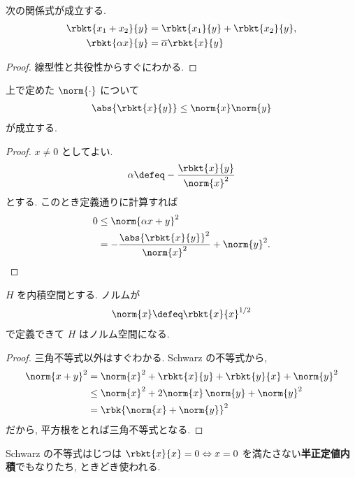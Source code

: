 \documentclass[openany, a4paper, oneside]{jsbook}
\begin{document}
\begin{prop}
 次の関係式が成立する.
 \begin{align}
  \rbkt{x_1 + x_2}{y}
  &=
  \rbkt{x_1}{y} + \rbkt{x_2}{y}, \\
  \rbkt{\alpha x}{y}
  &=
  \overline{\alpha} \rbkt{x}{y}
 \end{align}
\end{prop}
\begin{proof}
線型性と共役性からすぐにわかる.
\end{proof}
\begin{lem}
 上で定めた $\norm{\cdot}$ について
 \begin{align}
  \abs{\rbkt{x}{y}}
  \leq
  \norm{x} \norm{y}
 \end{align}
 が成立する.
\end{lem}
\begin{proof}
$x \neq 0$ としてよい.
\begin{align}
 \alpha
 \defeq
 -\frac{\rbkt{x}{y}}{\norm{x}^2}
\end{align}
とする.
このとき定義通りに計算すれば
\begin{align}
 0
 &\le
 \norm{\alpha x + y}^2 \\
 &=
 -\frac{\abs{\rbkt{x}{y}}^2}{\norm{x}^2} + \norm{y}^2.
\end{align}
\end{proof}

\begin{prop}
 $H$ を内積空間とする.
 ノルムが
 \begin{align}
  \norm{x}
  \defeq
  \rbkt{x}{x}^{1/2}
 \end{align}
 で定義できて $H$ はノルム空間になる.
\end{prop}
\begin{proof}
三角不等式以外はすぐわかる.
Schwarz の不等式から,
\begin{align}
 \norm{x + y}^2
 &=
 \norm{x}^2 + \rbkt{x}{y} + \rbkt{y}{x} + \norm{y}^2 \\
 &\le
 \norm{x}^2  + 2 \norm{x} \, \norm{y} + \norm{y}^2 \\
 &=
 \rbk{\norm{x} + \norm{y}}^2
\end{align}
だから, 平方根をとれば三角不等式となる.
\end{proof}
\begin{rem}
Schwarz の不等式はじつは
$\rbkt{x}{x} = 0 \Leftrightarrow x = 0$
を満たさない\textbf{半正定値内積}でもなりたち, ときどき使われる.
\end{rem}
\end{document}
